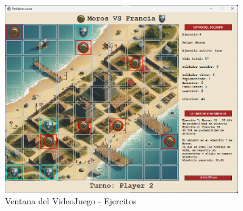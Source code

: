 \documentclass{article}
\begin{document}
    \begin{figure}[H]
        \centering
		\includegraphics[width=0.9\textwidth,keepaspectratio]{img/Menu_Tablero_Ejercitos.png}
        \caption{Ventana del VideoJuego - Ejercitos}
    \end{figure}
\end{document}
